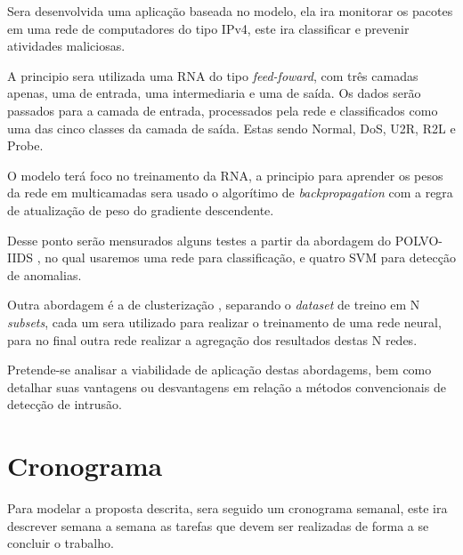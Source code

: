 \documentclass[
	12pt,				%
	openright,			%
	oneside,
	a4paper,			%
	english,			%
	french,				%
	spanish,			%
	brazil				%
	]{abntex2}
\begin{document}
Sera desenvolvida uma aplicação baseada no modelo, ela ira monitorar os pacotes em uma rede de computadores do tipo IPv4, este ira classificar e prevenir atividades maliciosas.

A principio sera utilizada uma RNA do tipo \textit{feed-foward}, com três camadas apenas, uma de entrada, uma intermediaria e uma de saída. Os dados serão passados para a camada de entrada, processados pela rede e classificados como uma das cinco classes da camada de saída. Estas sendo Normal, DoS, U2R, R2L e Probe.  

O modelo terá foco no treinamento da RNA, a principio para aprender os pesos da rede em multicamadas sera usado o algorítimo de \textit{backpropagation} com a regra de atualização de peso do gradiente descendente.

Desse ponto serão mensurados alguns testes a partir da abordagem do POLVO-IIDS \cite{polvo1}, no qual usaremos uma rede para classificação, e quatro SVM para detecção de anomalias.

Outra abordagem é a de clusterização \cite{Surana}, separando o \textit{dataset} de treino em N \textit{subsets}, cada um sera utilizado para realizar o treinamento de uma rede neural, para no final outra rede  realizar a agregação dos resultados destas N redes.

 
Pretende-se analisar a viabilidade de aplicação destas abordagems, bem como
detalhar suas vantagens ou desvantagens em relação a métodos convencionais de
detecção de intrusão.


\chapter[Cronograma]{Cronograma}

Para modelar a proposta descrita, sera seguido um cronograma semanal, este ira descrever semana a semana as tarefas que devem ser realizadas de forma a se concluir o trabalho.
\end{document}
